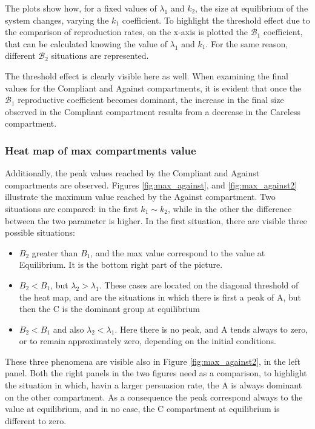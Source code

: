 The plots show how, for a fixed values of $\lambda_1$ and $k_2$, the size at equilibrium of the system changes, varying the $k_1$ coefficient. To highlight the threshold effect due to the comparison of reproduction rates, on the x-axis is plotted the $\mathcal{B}_1$  coefficient, that can be calculated knowing the value of  $\lambda_1$ and $k_1$. For the same reason, different $\mathcal{B}_2$ situations are represented. 

The threshold effect is clearly visible here as well. When examining the final values for the Compliant and Against compartments, it is evident that once the $\mathcal{B}_1$ reproductive coefficient becomes dominant, the increase in the final size observed in the Compliant compartment results from a decrease in the Careless compartment.

\subsubsection{Heat map of max compartments value}
Additionally, the peak values reached by the Compliant and Against compartments are observed. Figures \ref{fig:max_against}, and \ref{fig:max_against2} illustrate the maximum value reached by the Against compartment.
Two situations are compared: in the first $k_1 \sim k_2$, while in the other the difference between the two parameter is higher. In the first situation, there are visible three possible situations:
\begin{itemize}
	\item $B_2 $ greater than $B_1$, and the max value correspond to the value at Equilibrium. It is the bottom right part of the picture.
	\item $B_2 < B_1$, but $\lambda_2 > \lambda_1$. These cases are located on the diagonal threshold of the heat map, and are the situations in which there is first a peak of A, but then the C is the dominant group at equilibrium
	\item $B_2 < B_1$ and also $\lambda_2 < \lambda_1$. Here there is no peak, and A tends always to zero, or to remain approximately zero, depending on the initial conditions.
\end{itemize}
These three phenomena are visible also in Figure \ref{fig:max_against2}, in the left panel. Both the right panels in the two figures need as a comparison, to highlight the situation in which, havin a larger persuasion rate, the A is always dominant on the other compartment. As a consequence the peak correspond always to the value at equilibrium, and in no case, the C compartment at equilibrium is different to zero. 
